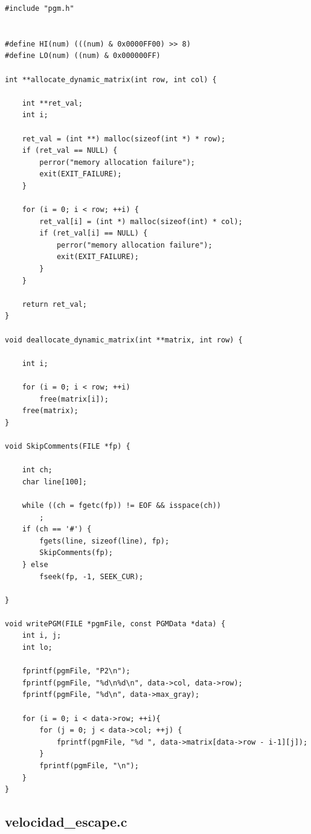\documentclass[a4paper,10pt]{article}
\begin{document}
\begin{verbatim}
#include "pgm.h"


#define HI(num)	(((num) & 0x0000FF00) >> 8)
#define LO(num)	((num) & 0x000000FF)

int **allocate_dynamic_matrix(int row, int col) {

	int **ret_val;
	int i;

	ret_val = (int **) malloc(sizeof(int *) * row);
	if (ret_val == NULL) {
		perror("memory allocation failure");
		exit(EXIT_FAILURE);
	}

	for (i = 0; i < row; ++i) {
		ret_val[i] = (int *) malloc(sizeof(int) * col);
		if (ret_val[i] == NULL) {
			perror("memory allocation failure");
			exit(EXIT_FAILURE);
		}
	}

	return ret_val;
}

void deallocate_dynamic_matrix(int **matrix, int row) {

	int i;

	for (i = 0; i < row; ++i)
		free(matrix[i]);
	free(matrix);
}

void SkipComments(FILE *fp) {

	int ch;
	char line[100];

	while ((ch = fgetc(fp)) != EOF && isspace(ch))
		;
	if (ch == '#') {
		fgets(line, sizeof(line), fp);
		SkipComments(fp);
	} else
		fseek(fp, -1, SEEK_CUR);

}

void writePGM(FILE *pgmFile, const PGMData *data) {
	int i, j;
	int lo;

	fprintf(pgmFile, "P2\n");
	fprintf(pgmFile, "%d\n%d\n", data->col, data->row);
	fprintf(pgmFile, "%d\n", data->max_gray);

	for (i = 0; i < data->row; ++i){
		for (j = 0; j < data->col; ++j) {
            fprintf(pgmFile, "%d ", data->matrix[data->row - i-1][j]);
		}
		fprintf(pgmFile, "\n");
	}
}

\end{verbatim}
\pagebreak

\subsection{velocidad\_escape.c}
\end{document}
